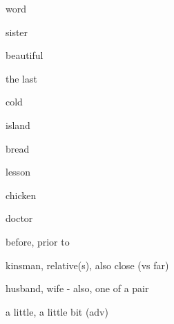 \documentclass[avery5371,grid,frame]{flashcards}
\begin{document}
\begin{flashcard}{\LARGE word}
\LARGE {}
\end{flashcard}
\begin{flashcard}{\LARGE sister}
\LARGE {}
\end{flashcard}
\begin{flashcard}{\LARGE beautiful}
\LARGE {}
\end{flashcard}
\begin{flashcard}{\LARGE the last}
\LARGE {}
\end{flashcard}
\begin{flashcard}{\LARGE cold}
\LARGE {}
\end{flashcard}
\begin{flashcard}{\LARGE island}
\LARGE {}
\end{flashcard}
\begin{flashcard}{\LARGE bread}
\LARGE {}
\end{flashcard}
\begin{flashcard}{\LARGE lesson}
\LARGE {}
\end{flashcard}
\begin{flashcard}{\LARGE chicken}
\LARGE {}
\end{flashcard}
\begin{flashcard}{\LARGE doctor}
\LARGE {}
\end{flashcard}
\begin{flashcard}{\LARGE before, prior to}
\LARGE {}
\end{flashcard}
\begin{flashcard}{\LARGE kinsman, relative(s), also close (vs far)}
\LARGE {}
\end{flashcard}
\begin{flashcard}{\LARGE husband, wife - also, one of a pair}
\LARGE {}
\end{flashcard}
\begin{flashcard}{\LARGE a little, a little bit (adv)}
\LARGE {}
\end{flashcard}
\end{document}
